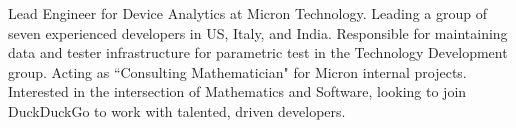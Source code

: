 

\begin{cvparagraph}

\vspace{1mm}
Lead Engineer for Device Analytics at Micron Technology. Leading a group of seven experienced developers in US, Italy, and India. Responsible for maintaining data and tester infrastructure for parametric test in the Technology Development group. Acting as ``Consulting Mathematician" for Micron internal projects. Interested in the intersection of Mathematics and Software, looking to join DuckDuckGo to work with talented, driven developers.
\end{cvparagraph}
